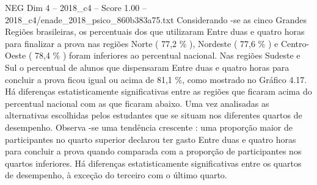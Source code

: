 \begin{textsample}{NEG Dim 4 – 2018\_c4 – Score 1.00 – 2018\_c4/enade\_2018\_psico\_860b383a75.txt}
Considerando -se as cinco Grandes Regiões brasileiras, os percentuais dos que utilizaram Entre duas e quatro horas para finalizar a prova nas regiões Norte ( 77,2 \% ), Nordeste ( 77,6 \% ) e Centro-Oeste ( 78,4 \% ) foram inferiores ao percentual nacional.
Nas regiões Sudeste e Sul o percentual de alunos que dispensaram Entre duas e quatro horas para concluir a prova ficou igual ou acima de 81,1 \%, como mostrado no Gráfico 4.17.
Há diferenças estatisticamente significativas entre as regiões que ficaram acima do percentual nacional com as que ficaram abaixo.
Uma vez analisadas as alternativas escolhidas pelos estudantes que se situam nos diferentes quartos de desempenho.
Observa -se uma tendência crescente : uma proporção maior de participantes no quarto superior declarou ter gasto Entre duas e quatro horas para concluir a prova quando comparada com a proporção de participantes nos quartos inferiores.
Há diferenças estatisticamente significativas entre os quartos de desempenho, à exceção do terceiro com o último quarto.

\end{textsample}
